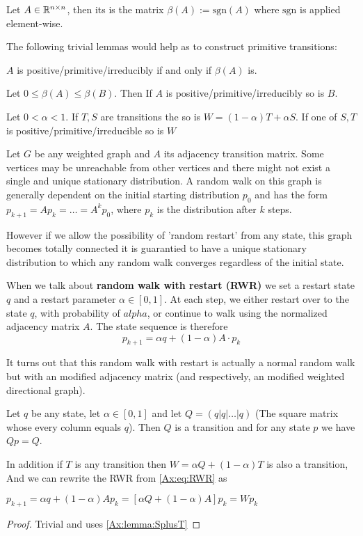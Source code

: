\begin{mydef}
Let $A \in \mathbb{R}^{n \times n}$, then its  is the matrix
$\beta(A) := \text{sgn}(A)$ where $\text{sgn}$ is applied element-wise.
\end{mydef}

The following trivial lemmas would help as to construct primitive transitions:

\begin{lemma}
\label{Ax:lemma:SplusT}
$A$ is positive/primitive/irreducibly if
and only if $\beta(A)$ is.

Let $0 \leq \beta(A) \leq \beta(B)$.
Then If $A$ is positive/primitive/irreducibly so is $B$.

Let $0 \lt \alpha \lt 1$. If $T,S$ are transitions the so is $W=(1-\alpha)T +
\alpha S$.
If one of $S,T$ is positive/primitive/irreducible so is $W$
\end{lemma}

Let $G$ be any weighted graph and $A$ its adjacency transition matrix. Some vertices may
be unreachable from other vertices and there might not exist a single and
unique stationary distribution.
A random walk on this graph is generally
dependent on the initial starting distribution $p_0$ and has the
form $p_{k+1} = Ap_k = \dots = A^k p_0$, where $p_k$ is the
distribution after $k$ steps.

However if we allow the possibility of 'random restart' from any state, this
graph becomes totally connected it is guarantied to have a unique stationary
distribution to which any random walk converges regardless of the initial state.

When we talk about \textbf{random walk with restart (RWR)} we set a restart
state $q$ and a restart parameter $\alpha \in [0,1]$. At each step, we
either restart over to the state $q$, with probability of
$alpha$, or continue to walk using the normalized adjacency matrix
$A$. The state sequence is therefore
\begin{equation}
\label{Ax:eq:RWR}
p_{k+1} = \alpha q + (1 -
\alpha) A \cdot p_k
\end{equation}

It turns out that this random walk with restart is actually a normal
random walk but with an modified adjacency matrix (and respectively, an
modified weighted directional graph). 

\begin{lemma}
\label{Ax:lemma:Qq}
Let $q$ be any state, let $\alpha \in [0,1]$ and let  
$ Q = (q|q|\dots|q)$ (The square matrix whose every column equals $q$).
Then $Q$ is a transition and for any state $p$ we have $Qp = Q$.

In addition if $T$ is any transition then $W = \alpha Q + (1-\alpha)
T$ is also a transition, And we can rewrite the RWR from
\ref{Ax:eq:RWR} as

$p_{k+1} = \alpha q + (1 - \alpha) Ap_k = 
[\alpha Q + (1 - \alpha) A] p_k = W p_k$

\begin{proof}
Trivial and uses \ref{Ax:lemma:SplusT}
\end{proof}
\end{lemma}

